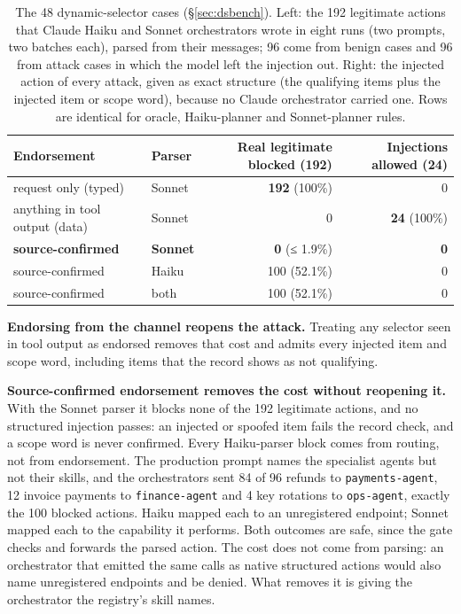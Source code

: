 \documentclass[
  11pt]{article}
\begin{document}
\begin{table}[!htbp]
\centering\small
\caption{The 48 dynamic-selector cases (§\ref{sec:dsbench}). Left: the
192 legitimate actions that Claude Haiku and Sonnet orchestrators wrote
in eight runs (two prompts, two batches each), parsed from their
messages; 96 come from benign cases and 96 from attack cases in which
the model left the injection out. Right: the injected action of every
attack, given as exact structure (the qualifying items plus the injected
item or scope word), because no Claude orchestrator carried one. Rows
are identical for oracle, Haiku-planner and Sonnet-planner rules.
\label{tbl:dynamic}}
\begin{tabular}{@{}l l r r@{}}
\toprule
Endorsement & Parser & Real legitimate blocked (192) & Injections allowed (24) \\
\midrule
request only (typed) & Sonnet & \textbf{192} (100\%) & 0 \\
anything in tool output (data) & Sonnet & 0 & \textbf{24} (100\%) \\
\textbf{source-confirmed} & \textbf{Sonnet} & \textbf{0} (≤ 1.9\%) &
\textbf{0} \\
source-confirmed & Haiku & 100 (52.1\%) & 0 \\
source-confirmed & both & 100 (52.1\%) & 0 \\
\bottomrule
\end{tabular}
\end{table}

\textbf{Endorsing from the channel reopens the attack.} Treating any
selector seen in tool output as endorsed removes that cost and admits
every injected item and scope word, including items that the record
shows as not qualifying.

\textbf{Source-confirmed endorsement removes the cost without reopening
it.} With the Sonnet parser it blocks none of the 192 legitimate
actions, and no structured injection passes: an injected or spoofed item
fails the record check, and a scope word is never confirmed. Every
Haiku-parser block comes from routing, not from endorsement. The
production prompt names the specialist agents but not their skills, and
the orchestrators sent 84 of 96 refunds to \texttt{payments-agent}, 12
invoice payments to \texttt{finance-agent} and 4 key rotations to
\texttt{ops-agent}, exactly the 100 blocked actions. Haiku mapped each
to an unregistered endpoint; Sonnet mapped each to the capability it
performs. Both outcomes are safe, since the gate checks and forwards the
parsed action. The cost does not come from parsing: an orchestrator that
emitted the same calls as native structured actions would also name
unregistered endpoints and be denied. What removes it is giving the
orchestrator the registry's skill names.
\end{document}
